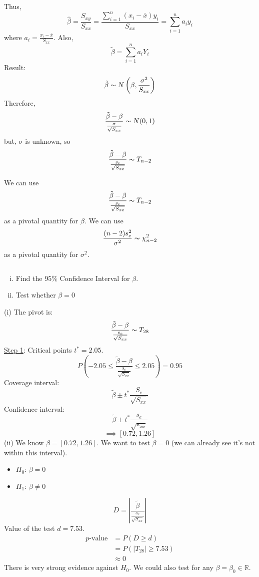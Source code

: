 Thus,
\[ \hat{\beta}=\frac{S_{xy}}{S_{xx}}=\frac{\sum\limits_{i=1}^{n} (x_i-\overline{x})y_i}{S_{xx}}=\sum\limits_{i=1}^{n} a_iy_i  \]
where $ a_i=\frac{x_i-\overline{x}}{S_{xx}} $.
Also,
\[ \tilde{\beta}=\sum\limits_{i=1}^{n} a_iY_i \]
Result:
\[ \tilde{\beta} \thicksim N\left(\beta,\frac{\sigma^2}{S_{xx}}\right) \]
Therefore,
\[ \frac{\tilde{\beta}-\beta}{\frac{\sigma}{\sqrt{S_{xx}}}} \thicksim N(0,1) \]
but, $ \sigma $ is unknown, so
\[ \frac{\tilde{\beta}-\beta}{\frac{s_e}{\sqrt{S_{xx}}}} \thicksim T_{n-2}  \]
\begin{thmbox}
    \begin{theorem} We can use
        \[ \frac{\tilde{\beta}-\beta}{\frac{s_e}{\sqrt{S_{xx}}}} \thicksim T_{n-2} \]
        as a pivotal quantity for $ \beta $. We can use
        \[ \frac{(n-2)s_e^2}{\sigma^2} \thicksim \chi^2_{n-2} \]
        as a pivotal quantity for $ \sigma^2 $.
    \end{theorem}
\end{thmbox}
\begin{exbox}
    \begin{example} $ \; $
        \begin{enumerate}[(i)]
            \item Find the $ 95\% $ Confidence Interval for $ \beta $.
            \item Test whether $ \beta=0 $
        \end{enumerate}
        (i) The pivot is:
        \[ \frac{\tilde{\beta}-\beta}{\frac{s_e}{\sqrt{S_{xx}}}} \thicksim T_{28} \]
        \underline{Step 1}: Critical points $ t^*=2.05 $.
        \[ P(-2.05\leqslant \frac{\tilde{\beta}-\beta}{\frac{s_e}{\sqrt{S_{xx}}}}\leqslant 2.05)=0.95\]
        Coverage interval:
        \[ \tilde{\beta}\pm t^* \frac{S_e}{\sqrt{S_{xx}}} \]
        Confidence interval:
        \[ \tilde{\beta}\pm t^* \frac{s_e}{\sqrt{s_{xx}}} \]
        \[ \implies [0.72,1.26] \]
        (ii) We know $ \beta=[0.72,1.26] $. We want to test $ \beta=0 $ (we can already see it's
        not within this interval).
        \begin{itemize}
            \item $ H_0 $: $ \beta=0 $
            \item $ H_1 $: $ \beta\neq 0 $
        \end{itemize}
        \[ D=\left|\frac{\tilde{\beta}}{\frac{s_e}{\sqrt{S_{xx}}}}\right| \]
        Value of the test $ d=7.53 $.
        \begin{align*}
            p\text{-value}
            &=P(D\geqslant d)\\
            &=P(|T_{28}|\geqslant 7.53)\\
            &\approx 0
        \end{align*}
        There is very strong evidence against $ H_0 $.
        We could also test for any $ \beta=\beta_0\in\mathbb{R} $.
    \end{example}
\end{exbox}
